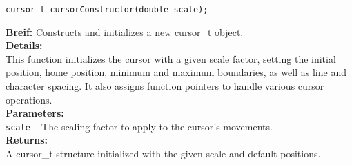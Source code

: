 

\begin{verbatim}
cursor_t cursorConstructor(double scale);
\end{verbatim}
\textbf{Breif:} Constructs and initializes a new cursor\_t object. \\
\textbf{Details:} \\
\hspace*{1cm}This function initializes the cursor with a given scale factor, setting the initial position, home position, minimum and maximum boundaries, as well as line and character spacing. It also assigns function pointers to handle various cursor operations. \\
\textbf{Parameters:} \\
\hspace*{1cm}\texttt{scale} -- The scaling factor to apply to the cursor's movements. \\
\textbf{Returns:} \\
\hspace*{1cm}A cursor\_t structure initialized with the given scale and default positions. \\[1em]
    

